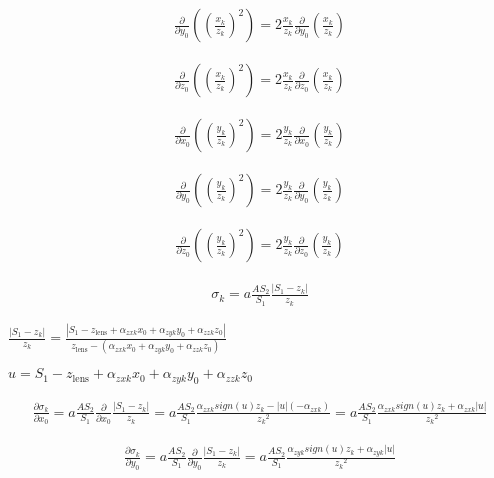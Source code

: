 \documentclass{article}
\begin{document}
\begin{align}
\frac{\partial}{\partial y_0}\left(\left(\frac{x_k}{z_k}\right)^2\right) = 2 \frac{x_k}{z_k} \frac{\partial}{\partial y_0}\left(\frac{x_k}{z_k}\right)
\end{align}

\begin{align}
\frac{\partial}{\partial z_0}\left(\left(\frac{x_k}{z_k}\right)^2\right) = 2 \frac{x_k}{z_k} \frac{\partial}{\partial z_0}\left(\frac{x_k}{z_k}\right)
\end{align}




\begin{align}
\frac{\partial}{\partial x_0}\left(\left(\frac{y_k}{z_k}\right)^2\right) = 2 \frac{y_k}{z_k} \frac{\partial}{\partial x_0}\left(\frac{y_k}{z_k}\right)
\end{align}

\begin{align}
\frac{\partial}{\partial y_0}\left(\left(\frac{y_k}{z_k}\right)^2\right) = 2 \frac{y_k}{z_k} \frac{\partial}{\partial y_0}\left(\frac{y_k}{z_k}\right)
\end{align}

\begin{align}
\frac{\partial}{\partial z_0}\left(\left(\frac{y_k}{z_k}\right)^2\right) = 2 \frac{y_k}{z_k} \frac{\partial}{\partial z_0}\left(\frac{y_k}{z_k}\right)
\end{align}





\begin{align}
\sigma_k = a \frac{AS_2}{S_1} \frac{|S_1-z_k|}{z_k}
\end{align}

$ \frac{|S_1-z_k|}{z_k} = \frac{|S_1 - z_\text{lens} + \alpha_{zxk}x_0 + \alpha_{zyk}y_0 + \alpha_{zzk}z_0|}{z_\text{lens} - (\alpha_{zxk}x_0 + \alpha_{zyk}y_0 + \alpha_{zzk}z_0)} $

$ u = S_1 - z_\text{lens} + \alpha_{zxk}x_0 + \alpha_{zyk}y_0 + \alpha_{zzk}z_0 $


\begin{align}
\frac{\partial \sigma_k}{\partial x_0} = a\frac{AS_2}{S_1} \frac{\partial}{\partial x_0} \frac{|S_1-z_k|}{z_k} =  a\frac{AS_2}{S_1} \frac{\alpha_{zxk}sign(u)z_k - |u|(-\alpha_{zxk})}{{z_k}^2} =  a\frac{AS_2}{S_1} \frac{\alpha_{zxk}sign(u)z_k + \alpha_{zxk}|u|}{{z_k}^2}
\end{align}

\begin{align}
\frac{\partial \sigma_k}{\partial y_0} = a\frac{AS_2}{S_1} \frac{\partial}{\partial y_0} \frac{|S_1-z_k|}{z_k} =  a\frac{AS_2}{S_1} \frac{\alpha_{zyk}sign(u)z_k + \alpha_{zyk}|u|}{{z_k}^2}
\end{align}
\end{document}
